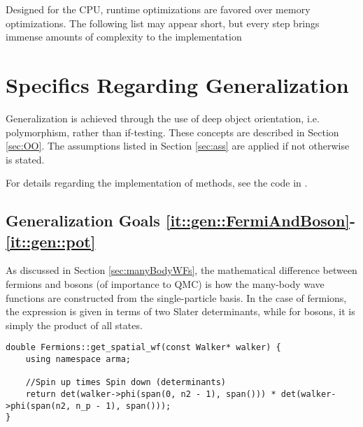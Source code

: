 Designed for the CPU, runtime optimizations are favored over memory optimizations. The following list may appear short, but every step brings immense amounts of complexity to the implementation


\clearpage
\section{Specifics Regarding Generalization}
\label{sec:specGen}

Generalization is achieved through the use of deep object orientation, i.e. polymorphism, rather than if-testing. These concepts are described in Section \ref{sec:OO}. The assumptions listed in Section \ref{sec:ass} are applied if not otherwise is stated.

For details regarding the implementation of methods, see the code in \cite{libBorealisCode}.

\subsection{Generalization Goals \ref{it::gen::FermiAndBoson}-\ref{it::gen::pot}}

As discussed in Section \ref{sec:manyBodyWFs}, the mathematical difference between fermions and bosons (of importance to QMC) is how the many-body wave functions are constructed from the single-particle basis. In the case of fermions, the expression is given in terms of two Slater determinants, while for bosons, it is simply the product of all states.

\vspace{0.2cm}
\begin{lstlisting}
double Fermions::get_spatial_wf(const Walker* walker) {
    using namespace arma;
    
    //Spin up times Spin down (determinants)
    return det(walker->phi(span(0, n2 - 1), span())) * det(walker->phi(span(n2, n_p - 1), span()));
}
\end{lstlisting}

